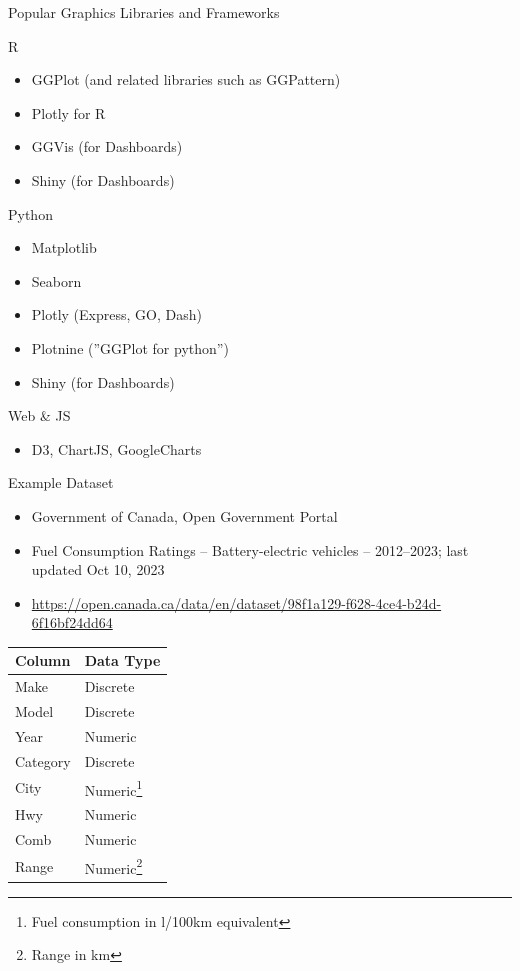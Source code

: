 \documentclass[ignorenonframetext,xcolor=x11names]{beamer}
\begin{document}
\begin{frame}[label=withcode]{Popular Graphics Libraries and Frameworks}
\begin{block}{R}
\begin{itemize}
  \item GGPlot (and related libraries such as GGPattern)
  \item Plotly for R
  \item GGVis (for Dashboards)
  \item Shiny (for Dashboards)
\end{itemize}
\end{block}
\begin{block}{Python}
\begin{itemize}
  \item Matplotlib
  \item Seaborn
  \item Plotly (Express, GO, Dash)
  \item Plotnine (''GGPlot for python'')
  \item Shiny (for Dashboards)
\end{itemize}
\end{block}
\begin{block}{Web \& JS}
\begin{itemize}
  \item D3, ChartJS, GoogleCharts
\end{itemize}
\end{block}
\end{frame}


\begin{frame}[label=withcode]{Example Dataset}
\begin{itemize}
  \item Government of Canada, Open Government Portal
  \item Fuel Consumption Ratings -- Battery-electric vehicles -- 2012--2023; last updated Oct 10, 2023
  \item \href{https://open.canada.ca/data/en/dataset/98f1a129-f628-4ce4-b24d-6f16bf24dd64}{https://open.canada.ca/data/en/dataset/98f1a129-f628-4ce4-b24d-6f16bf24dd64}
\end{itemize}
\centering
\footnotesize
\renewcommand{\arraystretch}{1.25}
	\begin{tabular}{|l|l|} \hline
	  {\bf Column} & {\bf Data Type} \\ \hline \hline
	  Make & Discrete \\ 
	  Model & Discrete \\
	  Year & Numeric \\
	  Category & Discrete \\
	  City & Numeric\footnote{Fuel consumption in l/100km equivalent} \\
	  Hwy & Numeric \\
	  Comb & Numeric \\
	  Range & Numeric\footnote{Range in km} \\ \hline
	\end{tabular}
\end{frame}
\end{document}
